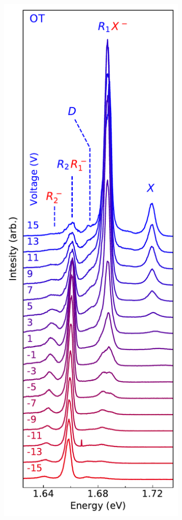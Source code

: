 \begin{figure}[t]
	\begin{subfigure}{0.32\textwidth}
		\caption{}
		\includegraphics[width=\textwidth]{waterfall_0T}

\end{subfigure}
\end{figure}

